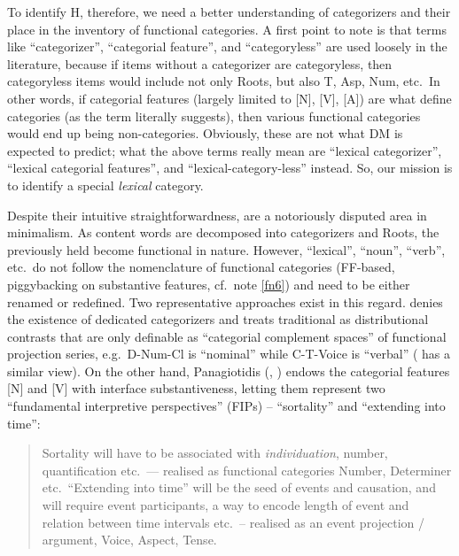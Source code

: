 \documentclass[output=paper]{langsci/langscibook}
\begin{document}
To identify H, therefore, we need a better understanding of categorizers and
their place in the inventory of functional categories. A first point to note is
that terms like ``categorizer'', ``categorial feature'', and ``categoryless'' are
used loosely in the literature, because if items without a categorizer are
categoryless, then categoryless items would include not only Roots, but also T,
Asp, Num, etc.\ In other words, if categorial features (largely limited to [N],
[V], [A]) are what define categories (as the term literally suggests), then
various functional categories would end up being non-categories. Obviously,
these are not what \gls{DM} is expected to predict; what the above terms really
mean are ``lexical categorizer'', ``lexical categorial features'', and
``lexical-category-less'' instead. So, our mission is to identify a special {\em
lexical} category.

Despite their intuitive straightforwardness,  are a
notoriously disputed area in minimalism. As content words are decomposed into
categorizers and Roots, the previously held  become
functional in nature. However, ``lexical'', ``noun'', ``verb'', etc.\ do not follow
the nomenclature of functional categories (FF-based, piggybacking on
substantive features, cf.\ note \ref{fn6}) and need to be either renamed or
redefined. Two representative approaches exist in this regard.
\citet{Borer2005} denies the existence of dedicated categorizers and treats
traditional  as distributional contrasts that are only
definable as ``categorial complement spaces'' of functional projection series,
e.g.\ D-Num-Cl is ``nominal'' while C-T-Voice is ``verbal''
(\citealt{Biberauer2016} has a similar view). On the other hand, Panagiotidis
(\citeyear{Panagiotidis2015}, \citeyear{Panagiotidis2017}) endows the
categorial features [N] and [V] with interface substantiveness, letting them
represent two ``fundamental interpretive perspectives''
(\glspl{FIP}) -- ``sortality'' and ``extending into
time'':

\blockquote[{\citealt[lecture 1, p.\ 4]{Panagiotidis2017}}]{Sortality will have
    to be associated with {\em individuation}, number, quantification etc.\ ---
    realised as functional categories Number, Determiner etc.\ ``Extending into
    time'' will be the seed of events and causation, and will require event
    participants, a way to encode length of event and relation between time
intervals etc.\ -- realised as an event projection / argument, Voice, Aspect,
Tense.}
\end{document}
